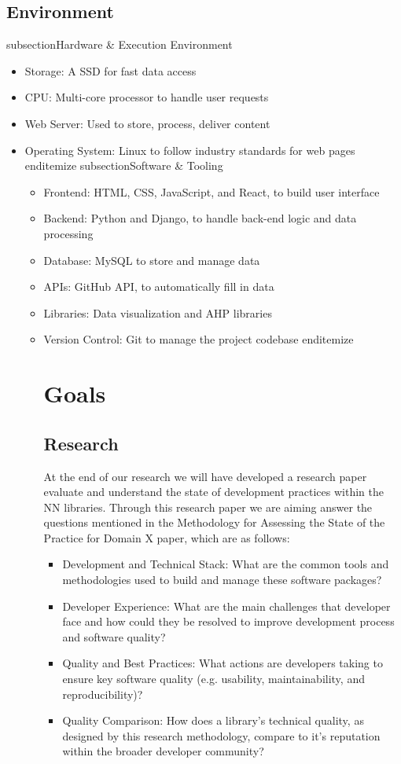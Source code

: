 \documentclass{article}
\begin{document}
\subsection{Environment}
subsection{Hardware & Execution Environment}
\begin{itemize}
    \item Storage: A SSD for fast data access
    \item CPU: Multi-core processor to handle user requests
    \item Web Server: Used to store, process, deliver content
    \item Operating System: Linux to follow industry standards for web pages
end{itemize}
subsection{Software & Tooling}
\begin{itemize}
    \item Frontend: HTML, CSS, JavaScript, and React, to build user interface
    \item Backend: Python and Django, to handle back-end logic and data processing
    \item Database: MySQL to store and manage data
    \item APIs: GitHub API, to automatically fill in data
    \item Libraries: Data visualization and AHP libraries
    \item Version Control: Git to manage the project codebase
end{itemize}

\section{Goals}
\subsection{Research}
At the end of our research we will have developed a research paper evaluate and understand the state of development practices within the NN libraries. Through this research paper we are aiming answer the questions mentioned in the Methodology for Assessing the State of the Practice for Domain X paper, which are as follows:
\begin{itemize}
    \item Development and Technical Stack: What are the common tools and methodologies used to build and manage these software packages?
    \item Developer Experience: What are the main challenges that developer face and how could they be resolved to improve development process and software quality?
    \item Quality and Best Practices: What actions are developers taking to ensure key software quality (e.g. usability, maintainability, and reproducibility)?
    \item Quality Comparison: How does a library's technical quality, as designed by this research methodology, compare to it's reputation within the broader developer community?
\end{itemize}

\end{itemize}
\end{itemize}
\end{document}
